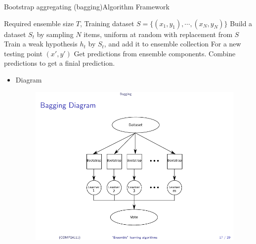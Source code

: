 \documentclass[first=dgreen,second=purple,logo=yellowexc]{aaltoslides}
\begin{document}
\begin{frame}[allowframebreaks]{Bootstrap aggregating (bagging)}{Algorithm Framework}
\begin{algorithm}[H]
\caption{Bagging}
\begin{algorithmic}[1]
\REQUIRE Required ensemble size $T$, Training dataset $S=\{(x_1,y_1),\cdots,(x_N,y_N)\}$ 
\STATE Build a dataset $S_t$ by sampling $N$ items, uniform at random with replacement from $S$
\STATE Train a weak hypothesis $h_t$ by $S_t$, and add it to ensemble collection
\ENDFOR
\STATE For a new testing point $(x',y')$
\STATE Get predictions from ensemble components.
\STATE Combine predictions to get a finial prediction.
\end{algorithmic}
\end{algorithm}
\framebreak
\begin{itemize}
    \item Diagram
        \begin{figure}
            \includegraphics[scale=0.8]{./plots/bagging1.pdf}
        \end{figure}
\end{itemize}
\end{frame}
\end{document}
